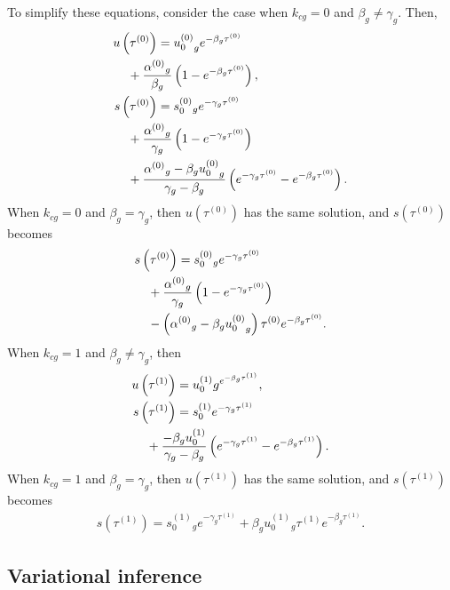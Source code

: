 \documentclass[
  sn-mathphys-num,
  lineno,
  twocolumn]{sn-jnl}
\begin{document}
To simplify these equations, consider the case when \(k_{cg} = 0\) and
\(\beta_g \neq \gamma_g\). Then, \begin{align}
u\left(\tau^{(0)}\right) &= {u_0^{(0)}}_g e^{-\beta_g \tau^{(0)}} \nonumber \\
  & \hskip -24pt + \frac{{\alpha^{(0)}}_g}{\beta_g}\left(1-e^{-\beta_g \tau^{(0)}}\right), 
  \label{eq-sol-usimp} \\
s\left(\tau^{(0)}\right) &= s_0^{(0)}{ }_g e^{-\gamma_g \tau^{(0)}} \nonumber \\
  & \hskip -24pt +\frac{{\alpha^{(0)}}_g}{\gamma_g}\left(1-e^{-\gamma_g \tau^{(0)}}\right) 
  \nonumber\\
  & \hskip -24pt +\frac{{\alpha^{(0)}}_g-\beta_g {u_0^{(0)}}_g}{\gamma_g-\beta_g}
  \left(e^{-\gamma_g \tau^{(0)}}-e^{-\beta_g \tau^{(0)}}\right). \label{eq-sol-ssimp}
\end{align} When \(k_{cg} = 0\) and \(\beta_g = \gamma_g\), then
\(u\left(\tau^{(0)}\right)\) has the same solution, and
\(s\left(\tau^{(0)}\right)\) becomes \begin{align}
s\left(\tau^{(0)}\right) &= s_0^{(0)}{ }_g e^{-\gamma_g \tau^{(0)}} \nonumber \\
  & \hskip -24pt +\frac{{\alpha^{(0)}}_g}{\gamma_g}
    \left(1-e^{-\gamma_g \tau^{(0)}}\right) \nonumber\\
  & \hskip -24pt - \left( {\alpha^{(0)}}_g-\beta_g {u_0^{(0)}}_g \right) 
    \tau^{(0)} e^{-\beta_g \tau^{(0)}}. \label{eq-sol-ssimp2}
\end{align} When \(k_{cg} = 1\) and \(\beta_g \neq \gamma_g\), then
\begin{align}
u\left(\tau^{(1)}\right) &=u_0^{(1)} g^{e^{-\beta_g \tau^{(1)}}}, \\
s\left(\tau^{(1)}\right) &=s_0^{(1)} e^{-\gamma_g \tau^{(1)}} \nonumber \\
  & \hskip -24pt +\frac{-\beta_g u_0^{(1)}}{\gamma_g-\beta_g}
  \left(e^{-\gamma_g \tau^{(1)}}-e^{-\beta_g \tau^{(1)}}\right).
\end{align} When \(k_{cg} = 1\) and \(\beta_g = \gamma_g\), then
\(u\left(\tau^{(1)}\right)\) has the same solution, and
\(s\left(\tau^{(1)}\right)\) becomes \begin{align}
s\left(\tau^{(1)}\right)=s_0^{(1)}{ }_g e^{-\gamma_g \tau^{(1)}}
  +\beta_g u_0^{(1)}{ }_g \tau^{(1)} e^{-\beta_g \tau^{(1)}}.
\end{align}

\subsection{Variational inference}\label{sec-methods-inference}
\end{document}
